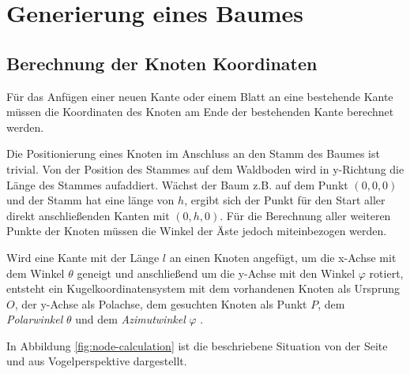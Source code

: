 \section{Generierung eines Baumes}

\subsection*{Berechnung der Knoten Koordinaten}

Für das Anfügen einer neuen Kante oder einem Blatt an eine bestehende Kante müssen die Koordinaten des Knoten am Ende der bestehenden Kante berechnet werden.
 
Die Positionierung eines Knoten im Anschluss an den Stamm des Baumes ist trivial. Von der Position des Stammes auf dem Waldboden wird in y-Richtung die Länge des Stammes aufaddiert. Wächst der Baum z.B. auf dem Punkt $(0, 0, 0)$ und der Stamm hat eine länge von $h$, ergibt sich der Punkt für den Start aller direkt anschließenden Kanten mit $(0, h, 0)$. Für die Berechnung aller weiteren Punkte der Knoten müssen die Winkel der Äste jedoch miteinbezogen werden.
  
Wird eine Kante mit der Länge $l$ an einen Knoten angefügt, um die x-Achse mit dem Winkel $\theta$ geneigt und anschließend um die y-Achse mit den Winkel $\varphi$ rotiert, entsteht ein Kugelkoordinatensystem mit dem vorhandenen Knoten als Ursprung $O$, der y-Achse als Polachse, dem gesuchten Knoten als Punkt $P$, dem \emph{Polarwinkel} $\theta$ und dem \emph{Azimutwinkel} $\varphi$ \cite{papula2001mathematik}.

In Abbildung \ref{fig:node-calculation} ist die beschriebene Situation von der Seite und aus Vogelperspektive dargestellt.

